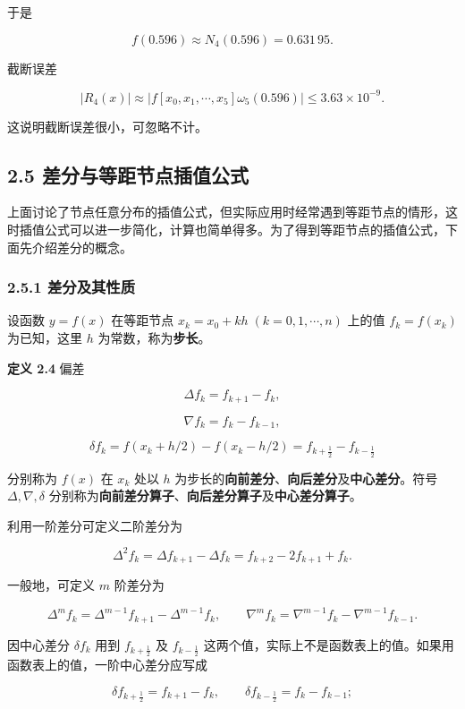 \documentclass[
  10pt,
  fontset=fandol]{ctexart}
\begin{document}
于是

\[
f(0.596)\approx N_4(0.596)=0.631\,95.
\]

截断误差

\[
|R_4(x)|\approx|f[x_0,x_1,\cdots,x_5]\omega_5(0.596)|\le3.63\times10^{-9}.
\]

这说明截断误差很小，可忽略不计。

\subsection{2.5 差分与等距节点插值公式}\label{ux5deeux5206ux4e0eux7b49ux8dddux8282ux70b9ux63d2ux503cux516cux5f0f}

上面讨论了节点任意分布的插值公式，但实际应用时经常遇到等距节点的情形，这时插值公式可以进一步简化，计算也简单得多。为了得到等距节点的插值公式，下面先介绍差分的概念。

\subsubsection{2.5.1 差分及其性质}\label{ux5deeux5206ux53caux5176ux6027ux8d28}

设函数 \(y=f(x)\) 在等距节点 \(x_k=x_0+kh\;(k=0,1,\cdots,n)\) 上的值 \(f_k=f(x_k)\) 为已知，这里 \(h\) 为常数，称为\textbf{步长}。

\textbf{定义 2.4} 偏差

\[
\Delta f_k=f_{k+1}-f_k,
\tag{2.5.1}
\]

\[
\nabla f_k=f_k-f_{k-1},
\tag{2.5.2}
\]

\[
\delta f_k=f(x_k+h/2)-f(x_k-h/2)=f_{k+\frac12}-f_{k-\frac12}
\tag{2.5.3}
\]

分别称为 \(f(x)\) 在 \(x_k\) 处以 \(h\) 为步长的\textbf{向前差分}、\textbf{向后差分}及\textbf{中心差分}。符号 \(\Delta,\nabla,\delta\) 分别称为\textbf{向前差分算子}、\textbf{向后差分算子}及\textbf{中心差分算子}。

利用一阶差分可定义二阶差分为

\[
\Delta^2 f_k=\Delta f_{k+1}-\Delta f_k=f_{k+2}-2f_{k+1}+f_k.
\]

一般地，可定义 \(m\) 阶差分为

\[
\Delta^m f_k=\Delta^{m-1}f_{k+1}-\Delta^{m-1}f_k,\qquad
\nabla^m f_k=\nabla^{m-1}f_k-\nabla^{m-1}f_{k-1}.
\]

因中心差分 \(\delta f_k\) 用到 \(f_{k+\frac12}\) 及 \(f_{k-\frac12}\) 这两个值，实际上不是函数表上的值。如果用函数表上的值，一阶中心差分应写成

\[
\delta f_{k+\frac12}=f_{k+1}-f_k,\qquad
\delta f_{k-\frac12}=f_k-f_{k-1};
\]
\end{document}
